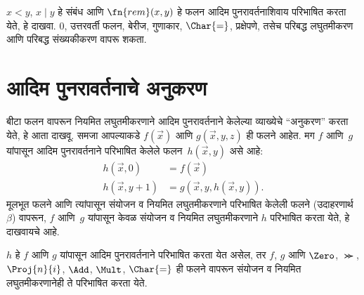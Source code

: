 \begin{prob}
  $x < y$, $x \mid y$ हे संबंध आणि $\fn{rem}(x,y)$ हे
  फलन आदिम पुनरावर्तनाशिवाय परिभाषित करता येते, हे दाखवा.
  $0$, उत्तरवर्ती फलन, बेरीज, गुणाकार, $\Char{=}$,
  प्रक्षेपणे, तसेच परिबद्ध लघुतमीकरण आणि परिबद्ध संख्यकीकरण
  वापरू शकता.
\end{prob}











\section{आदिम पुनरावर्तनाचे अनुकरण}\label{inc:req:pri:sec}

बीटा फलन वापरून नियमित लघुतमीकरणाने आदिम पुनरावर्तनाने केलेल्या
व्याख्येचे ``अनुकरण'' करता येते, हे आता दाखवू. समजा आपल्याकडे
$f(\vec x)$ आणि $g(\vec x, y, z)$ ही फलने आहेत. मग $f$ आणि~$g$
यांपासून आदिम पुनरावर्तनाने परिभाषित केलेले फलन~$h(\vec x,y)$
असे आहे:
\begin{align*}
h(\vec x, 0) & =  f(\vec x) \\
h(\vec x, y+1) & =  g(\vec x, y, h(\vec x, y)).
\end{align*}
मूलभूत फलने आणि त्यांपासून संयोजन व नियमित लघुतमीकरणाने
परिभाषित केलेली फलने (उदाहरणार्थ~$\beta$) वापरून,
$f$ आणि~$g$ यांपासून केवळ संयोजन व नियमित लघुतमीकरणाने
$h$ परिभाषित करता येते, हे दाखवायचे आहे.

\begin{lem}
\label{inc:req:pri:lem:prim-rec}
$h$ हे $f$ आणि $g$ यांपासून आदिम पुनरावर्तनाने परिभाषित
करता येत असेल, तर $f$, $g$ आणि $\Zero$, $\Succ$,
$\Proj{n}{i}$, $\Add$, $\Mult$, $\Char{=}$ ही फलने
वापरून संयोजन व नियमित लघुतमीकरणानेही ते परिभाषित करता येते.
\end{lem}

